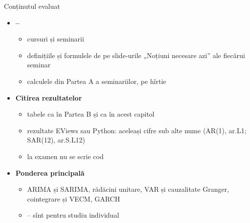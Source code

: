 \begin{frame}{Conținutul evaluat}
\itemsize{\small}
\begin{itemize}
    \item \textbf{--}
    \begin{itemize}
        \item cursuri și seminarii
        \item definițiile și formulele de pe slide-urile „Noțiuni necesare azi” ale fiecărui seminar
        \item calculele din Partea A a seminariilor, pe hîrtie
    \end{itemize}
    \item \textbf{Citirea rezultatelor}
    \begin{itemize}
        \item tabele ca în Partea B și ca în acest capitol
        \item rezultate EViews sau Python: aceleași cifre sub alte nume (AR(1), ar.L1; SAR(12), ar.S.L12)
        \item la examen nu se scrie cod
    \end{itemize}
    \item \textbf{Ponderea principală}
    \begin{itemize}
        \item ARIMA și SARIMA, rădăcini unitare, VAR și cauzalitate Granger, cointegrare și VECM, GARCH
        \item {}-- sînt pentru studiu individual
    \end{itemize}
\end{itemize}
\end{frame}

